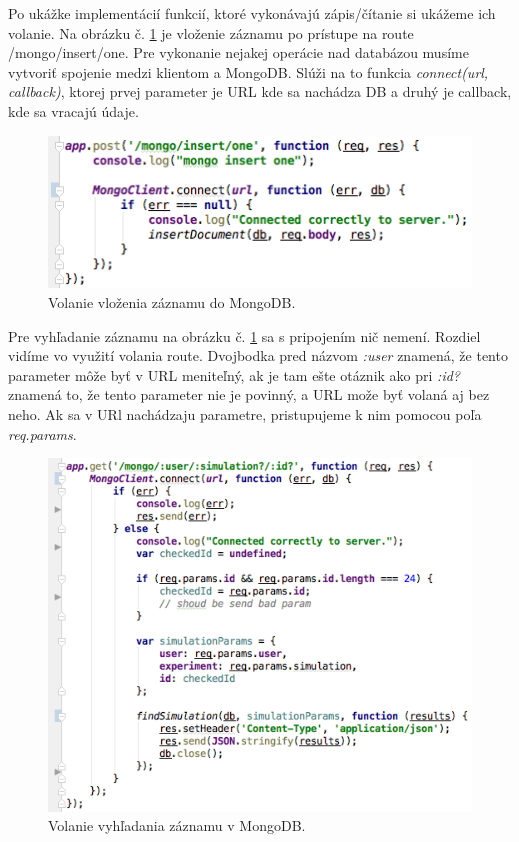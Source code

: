 Po ukážke implementácií funkcií, ktoré vykonávajú zápis/čítanie si ukážeme ich volanie. Na obrázku č. \ref{img-express-mongodb-insert2} je vloženie záznamu po prístupe na route /mongo/insert/one. Pre vykonanie nejakej operácie nad databázou musíme vytvoriť spojenie medzi klientom a MongoDB. Slúži na to funkcia \textit{connect(url, callback)}, ktorej prvej parameter je URL kde sa nachádza DB a druhý je callback, kde sa vracajú údaje.

\begin{figure}[H]
  \centering
  \includegraphics[scale=0.7]{img/code/express-mongo-insert2.png}
  \caption{Volanie vloženia záznamu do MongoDB.}
  \label{img-express-mongodb-insert2}
\end{figure}

Pre vyhľadanie záznamu na obrázku č. \ref{img-express-mongodb-insert2} sa s pripojením nič nemení. Rozdiel vidíme vo využití volania route. Dvojbodka pred názvom \textit{:user} znamená, že tento parameter môže byť v URL meniteľný, ak je tam ešte otáznik ako pri \textit{:id?} znamená to, že tento parameter nie je povinný, a URL može byť volaná aj bez neho. Ak sa v URl nachádzaju parametre, pristupujeme k nim pomocou poľa \textit{req.params}.

\begin{figure}[H]
  \centering
  \includegraphics[scale=0.7]{img/code/express-mongodb-find2.png}
  \caption{Volanie vyhľadania záznamu v MongoDB.}
  \label{img-express-mongodb-find}
\end{figure}
 

